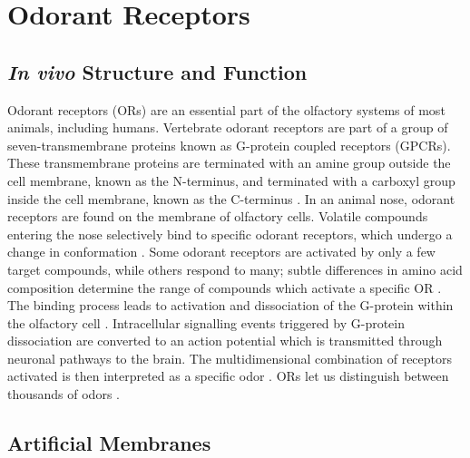 \documentclass[
  a4paper,
]{scrbook}
\begin{document}
\hypertarget{sec-odorant-receptors}{%
\section{Odorant Receptors}\label{sec-odorant-receptors}}

\hypertarget{in-vivo-structure-and-function}{%
\subsection{\texorpdfstring{\emph{In vivo} Structure and
Function}{In vivo Structure and Function}}\label{in-vivo-structure-and-function}}

Odorant receptors (ORs) are an essential part of the olfactory systems
of most animals, including humans. Vertebrate odorant receptors are part
of a group of seven-transmembrane proteins known as G-protein coupled
receptors (GPCRs). These transmembrane proteins are terminated with an
amine group outside the cell membrane, known as the N-terminus, and
terminated with a carboxyl group inside the cell membrane, known as the
C-terminus \autocite{Glatz2011}. In an animal nose, odorant receptors
are found on the membrane of olfactory cells. Volatile compounds
entering the nose selectively bind to specific odorant receptors, which
undergo a change in conformation \autocite{Dung2018,Kim2022a}. Some
odorant receptors are activated by only a few target compounds, while
others respond to many; subtle differences in amino acid composition
determine the range of compounds which activate a specific OR
\autocite{Yang2018,Goodwin2021}. The binding process leads to activation
and dissociation of the G-protein within the olfactory cell
\autocite{Buck1991,Zhang2021}. Intracellular signalling events triggered
by G-protein dissociation are converted to an action potential which is
transmitted through neuronal pathways to the brain. The multidimensional
combination of receptors activated is then interpreted as a specific
odor \autocite{Buck1991,Kwon2015,Dung2018,Kim2022a}. ORs let us
distinguish between thousands of odors
\autocite{Buck1991,Dung2018,Yang2018,Kim2022a}.

\hypertarget{sec-artificial-membranes}{%
\subsection{Artificial Membranes}\label{sec-artificial-membranes}}
\end{document}
